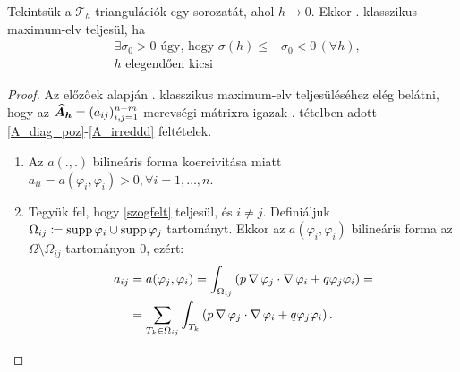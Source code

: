 \begin{statement}\label{cDMP_telj}
	Tekintsük a $\mathcal{T}_h$ triangulációk egy sorozatát, ahol $h \rightarrow 0$. Ekkor . klasszikus maximum-elv teljesül, ha 
	\begin{align}
		&\exists \sigma_0 > 0 \text{ úgy, hogy } \sigma(h) \leq -\sigma_0 < 0 \, (\forall h), \label{szogfelt} \\
		& h  \text{ elegendően kicsi} \label{hfelt}
	\end{align}
\end{statement}


\begin{proof}
	Az előzőek alapján  . klasszikus maximum-elv teljesüléséhez elég belátni, hogy az $\bm{\widehat{A}_h} = (a_{ij})_{i,j=1}^{n+m}$ merevségi mátrixra igazak . tételben adott  \ref{A_diag_poz}-\ref{A_irreddd} feltételek. 
	\begin{enumerate}[label=(\roman*)]
		\item Az $a(.,.)$ bilineáris forma koercivitása miatt $a_{ii} = a(\varphi_i,\varphi_i) > 0, \forall i = 1, \ldots, n$.
		\item Tegyük fel, hogy \eqref{szogfelt} teljesül, és $i \neq j$. Definiáljuk $\Omega_{ij} \coloneqq   \operatorname{supp} \varphi_i \cup \operatorname{supp} \varphi_j$ tartományt. Ekkor az $a(\varphi_i,\varphi_i)$ bilineáris forma az $\Omega \setminus \Omega_{ij}$ tartományon $0$, ezért:
			\begin{align*}
				a_{ij} &= a(\varphi_j,\varphi_i) =  \int_{\Omega_{ij}} \left( p \operatorname{\nabla} \varphi_j \cdot \operatorname{\nabla} \varphi_i  + q \varphi_j \varphi_i \right) = \\
				&= \sum_{T_k \in \Omega_{ij}} \int_{T_k} \left( p \operatorname{\nabla} \varphi_j \cdot \operatorname{\nabla} \varphi_i  + q \varphi_j \varphi_i \right).
			\end{align*}
			

\end{enumerate}
\end{proof}
